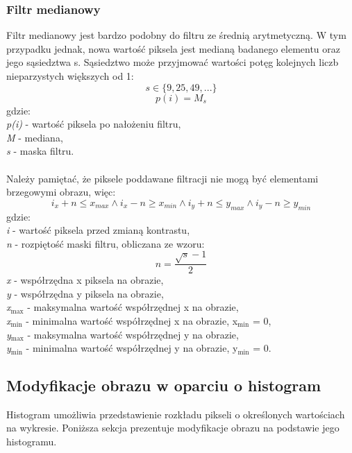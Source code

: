 \documentclass{classrep}
\begin{document}
\subsubsection{Filtr medianowy}
Filtr medianowy jest bardzo podobny do filtru ze średnią arytmetyczną. W tym przypadku jednak, nowa wartość piksela jest medianą badanego elementu oraz jego sąsiedztwa s. Sąsiedztwo może przyjmować wartości potęg kolejnych liczb nieparzystych większych od 1:\\
\[ s \in \{9,25,49,...\} \]
\[ p(i) = M_{s} \]
gdzie:\\
\textit{p(i)} - wartość piksela po nałożeniu filtru,\\
\textit{M} - mediana,\\
\textit{s} - maska filtru.\\
\\
Należy pamiętać, że piksele poddawane filtracji nie mogą być elementami brzegowymi obrazu, więc:
\[ i_x + n \leq x_{max} \wedge i_x - n \geq x_{min} \wedge i_y + n \leq y_{max} \wedge i_y - n \geq y_{min} \]
gdzie:\\
\textit{i} - wartość piksela przed zmianą kontrastu,\\
\textit{n} - rozpiętość maski filtru, obliczana ze wzoru:\\
\[ n = \frac{\sqrt{s}-1}{2} \]
\textit{x} - współrzędna x piksela na obrazie,\\
\textit{y} - współrzędna y piksela na obrazie,\\
\textit{x$_{\text{max}}$} - maksymalna wartość współrzędnej x na obrazie,\\
\textit{x$_{\text{min}}$} - minimalna wartość współrzędnej x na obrazie, x$_{\text{min}}$ = 0,\\
\textit{y$_{\text{max}}$} - maksymalna wartość współrzędnej y na obrazie,\\
\textit{y$_{\text{min}}$} - minimalna wartość współrzędnej y na obrazie, y$_{\text{min}}$ = 0.\\

\subsection{Modyfikacje obrazu w oparciu o histogram}
Histogram umożliwia przedstawienie rozkładu pikseli o określonych wartościach na wykresie. Poniższa sekcja prezentuje modyfikacje obrazu na podstawie jego histogramu.
\end{document}
